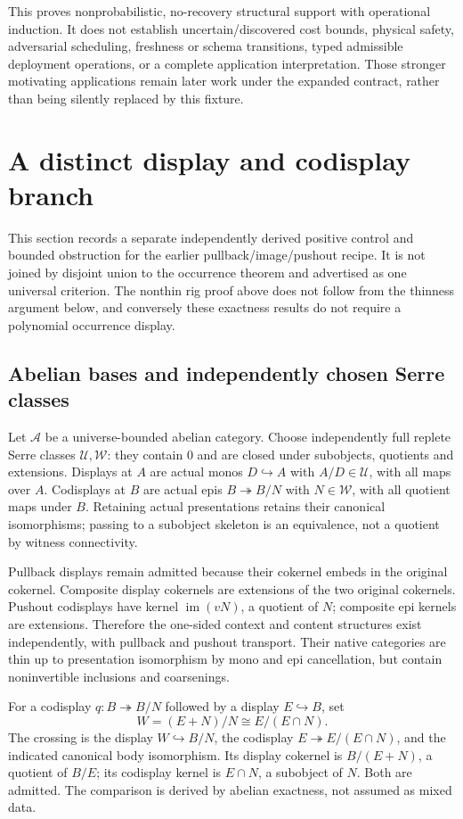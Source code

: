 \documentclass[11pt,a4paper]{article}
\theoremstyle{definition}
\newcommand{\A}{\mathcal A}
\newcommand{\Uclass}{\mathcal U}
\newcommand{\Wclass}{\mathcal W}
\newcommand{\im}{\operatorname{im}}
\begin{document}
This proves nonprobabilistic, no-recovery structural support with operational
induction. It does not establish uncertain/discovered cost bounds, physical
safety, adversarial scheduling, freshness or schema transitions, typed
admissible deployment operations, or a complete application interpretation.
Those stronger motivating applications remain later work under the expanded
contract, rather than being silently replaced by this fixture.

\section{A distinct display and codisplay branch}\label{sec:pbpo}

This section records a separate independently derived positive control and
bounded obstruction for the earlier pullback/image/pushout recipe. It is not
joined by disjoint union to the occurrence theorem and advertised as one
universal criterion. The nonthin rig proof above does not follow from the
thinness argument below, and conversely these exactness results do not require
a polynomial occurrence display.

\subsection{Abelian bases and independently chosen Serre classes}
Let $\A$ be a universe-bounded abelian category. Choose independently full
replete Serre classes $\Uclass,\Wclass$: they contain $0$ and are closed under
subobjects, quotients and extensions. Displays at $A$ are actual monos
$D\hookrightarrow A$ with $A/D\in\Uclass$, with all maps over $A$.
Codisplays at $B$ are actual epis $B\twoheadrightarrow B/N$ with
$N\in\Wclass$, with all quotient maps under $B$. Retaining actual presentations
retains their canonical isomorphisms; passing to a subobject skeleton is an
equivalence, not a quotient by witness connectivity.

Pullback displays remain admitted because their cokernel embeds in the original
cokernel. Composite display cokernels are extensions of the two original
cokernels. Pushout codisplays have kernel $\im(vN)$, a quotient of $N$;
composite epi kernels are extensions. Therefore the one-sided context and
content structures exist independently, with pullback and pushout transport.
Their native categories are thin up to presentation isomorphism by mono and
epi cancellation, but contain noninvertible inclusions and coarsenings.

For a codisplay $q:B\twoheadrightarrow B/N$ followed by a display
$E\hookrightarrow B$, set
\[
 W=(E+N)/N\cong E/(E\cap N).
\]
The crossing is the display $W\hookrightarrow B/N$, the codisplay
$E\twoheadrightarrow E/(E\cap N)$, and the indicated canonical body
isomorphism. Its display cokernel is $B/(E+N)$, a quotient of $B/E$; its
codisplay kernel is $E\cap N$, a subobject of $N$. Both are admitted.
The comparison is derived by abelian exactness, not assumed as mixed data.
\end{document}
